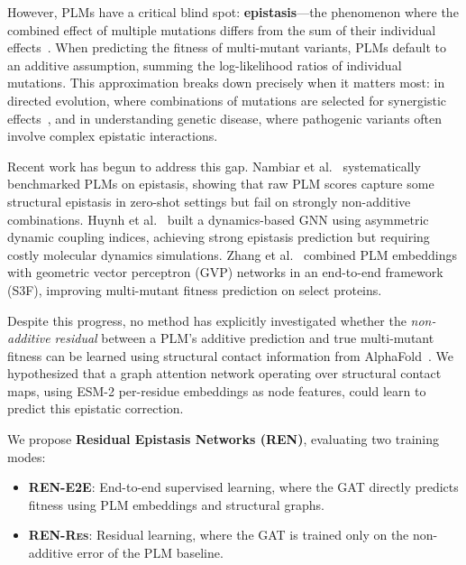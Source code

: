 \documentclass{article}
\newcommand{\ren}{\textsc{REN}}
\newcommand{\rene}{\textsc{REN-E2E}}
\newcommand{\renr}{\textsc{REN-Res}}
\begin{document}
However, PLMs have a critical blind spot: \textbf{epistasis}---the phenomenon where the combined effect of multiple mutations differs from the sum of their individual effects~\citep{olson2014comprehensive}. When predicting the fitness of multi-mutant variants, PLMs default to an additive assumption, summing the log-likelihood ratios of individual mutations. This approximation breaks down precisely when it matters most: in directed evolution, where combinations of mutations are selected for synergistic effects~\citep{wu2016adaptation}, and in understanding genetic disease, where pathogenic variants often involve complex epistatic interactions.

Recent work has begun to address this gap. Nambiar et al.~\citep{Nambiar2025PLMEpistasis} systematically benchmarked PLMs on epistasis, showing that raw PLM scores capture some structural epistasis in zero-shot settings but fail on strongly non-additive combinations. Huynh et al.~\citep{Huynh2025DynamicsEpistasis} built a dynamics-based GNN using asymmetric dynamic coupling indices, achieving strong epistasis prediction but requiring costly molecular dynamics simulations. Zhang et al.~\citep{zhang2024multiscale} combined PLM embeddings with geometric vector perceptron (GVP) networks in an end-to-end framework (S3F), improving multi-mutant fitness prediction on select proteins.

Despite this progress, no method has explicitly investigated whether the \emph{non-additive residual} between a PLM's additive prediction and true multi-mutant fitness can be learned using structural contact information from AlphaFold~\citep{jumper2021highly}. We hypothesized that a graph attention network operating over structural contact maps, using ESM-2 per-residue embeddings as node features, could learn to predict this epistatic correction.

We propose \textbf{Residual Epistasis Networks (\ren{})}, evaluating two training modes:
\begin{itemize}
    \item \textbf{\rene{}}: End-to-end supervised learning, where the GAT directly predicts fitness using PLM embeddings and structural graphs.
    \item \textbf{\renr{}}: Residual learning, where the GAT is trained only on the non-additive error of the PLM baseline.
\end{itemize}
\end{document}
